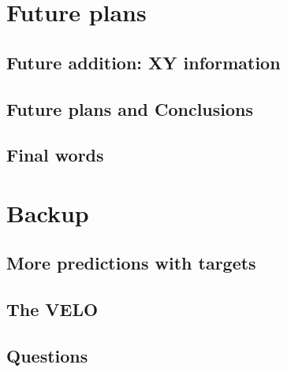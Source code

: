 \documentclass[aspectratio=169, 10pt]{beamer}
\begin{document}

\section{Future plans}

\subsection{Future addition: XY information}


\subsection{Future plans and Conclusions}


\subsection{Final words}




\backupbegin

\section{Backup}

\subsection{More predictions with targets}


\subsection{The VELO}


\subsection{Questions}




\backupend
\end{document}

